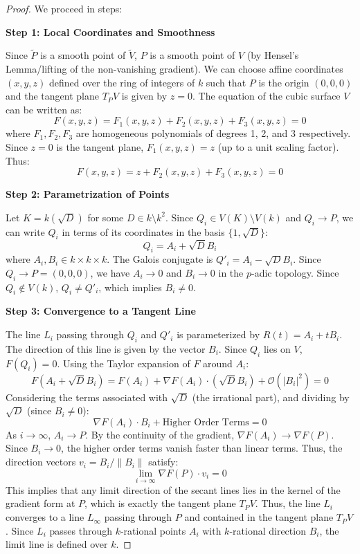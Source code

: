 \documentclass[10pt,a4paper]{amsart}
\begin{document}
\begin{proof}
We proceed in steps:

\vspace{0.5em}
\noindent\textbf{Step 1: Local Coordinates and Smoothness}

    Since $\tilde{P}$ is a smooth point of $\tilde{V}$, $P$ is a smooth point of $V$ (by Hensel's Lemma/lifting of the non-vanishing gradient). We can choose affine coordinates $(x,y,z)$ defined over the ring of integers of $k$ such that $P$ is the origin $(0,0,0)$ and the tangent plane $T_P V$ is given by $z=0$.
    The equation of the cubic surface $V$ can be written as:
    \[ F(x,y,z) = F_1(x,y,z) + F_2(x,y,z) + F_3(x,y,z) = 0 \]
    where $F_1, F_2, F_3$ are homogeneous polynomials of degrees 1, 2, and 3 respectively. Since $z=0$ is the tangent plane, $F_1(x,y,z) = z$ (up to a unit scaling factor). Thus:
    \[ F(x,y,z) = z + F_2(x,y,z) + F_3(x,y,z) = 0 \]

\vspace{0.5em}
\noindent\textbf{Step 2: Parametrization of Points}

    Let $K = k(\sqrt{D})$ for some $D \in k \setminus k^2$. Since $Q_i \in V(K) \setminus V(k)$ and $Q_i \to P$, we can write $Q_i$ in terms of its coordinates in the basis $\{1, \sqrt{D}\}$:
    \[ Q_i = A_i + \sqrt{D} B_i \]
    where $A_i, B_i \in k \times k \times k$. The Galois conjugate is $Q'_i = A_i - \sqrt{D} B_i$.
    Since $Q_i \to P=(0,0,0)$, we have $A_i \to 0$ and $B_i \to 0$ in the $p$-adic topology.
    Since $Q_i \notin V(k)$, $Q_i \neq Q'_i$, which implies $B_i \neq 0$.

\vspace{0.5em}
\noindent\textbf{Step 3: Convergence to a Tangent Line}

    The line $L_i$ passing through $Q_i$ and $Q'_i$ is parameterized by $R(t) = A_i + t B_i$. The direction of this line is given by the vector $B_i$.
    Since $Q_i$ lies on $V$, $F(Q_i) = 0$. Using the Taylor expansion of $F$ around $A_i$:
    \[ F(A_i + \sqrt{D} B_i) = F(A_i) + \nabla F(A_i) \cdot (\sqrt{D} B_i) + \mathcal{O}(|B_i|^2) = 0 \]
    Considering the terms associated with $\sqrt{D}$ (the irrational part), and dividing by $\sqrt{D}$ (since $B_i \neq 0$):
    \[ \nabla F(A_i) \cdot B_i + \text{Higher Order Terms} = 0 \]
    As $i \to \infty$, $A_i \to P$. By the continuity of the gradient, $\nabla F(A_i) \to \nabla F(P)$. Since $B_i \to 0$, the higher order terms vanish faster than linear terms. Thus, the direction vectors $v_i = B_i / \|B_i\|$ satisfy:
    \[ \lim_{i \to \infty} \nabla F(P) \cdot v_i = 0 \]
    This implies that any limit direction of the secant lines lies in the kernel of the gradient form at $P$, which is exactly the tangent plane $T_P V$.
    Thus, the line $L_i$ converges to a line $L_\infty$ passing through $P$ and contained in the tangent plane $T_P V$. Since $L_i$ passes through $k$-rational points $A_i$ with $k$-rational direction $B_i$, the limit line is defined over $k$.


\end{proof}
\end{document}
